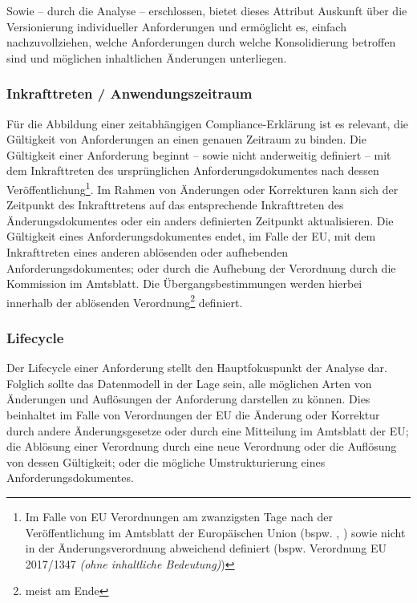 Sowie -- durch die Analyse -- erschlossen, bietet dieses Attribut Auskunft über die Versionierung individueller Anforderungen und ermöglicht es, einfach nachzuvollziehen, welche Anforderungen durch welche Konsolidierung betroffen sind und möglichen inhaltlichen Änderungen unterliegen.


\subsubsection{Inkrafttreten / Anwendungszeitraum}

Für die Abbildung einer zeitabhängigen Compliance-Erklärung ist es relevant, die Gültigkeit von Anforderungen an einen genauen Zeitraum zu binden.
Die Gültigkeit einer Anforderung beginnt -- sowie nicht anderweitig definiert -- mit dem Inkrafttreten des ursprünglichen Anforderungsdokumentes nach dessen Veröffentlichung\footnote{Im Falle von EU Verordnungen am zwanzigsten Tage nach der Veröffentlichung im Amtsblatt der Europäischen Union (bspw. \cite[Art. 141]{2018R1139}, \cite[Art. 14]{2004R0549}) sowie nicht in der Änderungsverordnung abweichend definiert (bspw. Verordnung EU 2017/1347 \textit{(ohne inhaltliche Bedeutung)})}.
Im Rahmen von Änderungen oder Korrekturen kann sich der Zeitpunkt des Inkrafttretens auf das entsprechende Inkrafttreten des Änderungsdokumentes oder ein anders definierten Zeitpunkt  aktualisieren.\cite{eu_consolidation}
Die Gültigkeit eines Anforderungsdokumentes endet, im Falle der EU, mit dem Inkrafttreten eines anderen ablösenden oder aufhebenden Anforderungsdokumentes; oder durch die Aufhebung der Verordnung durch die Kommission im Amtsblatt. 
Die Übergangsbestimmungen werden hierbei innerhalb der ablösenden Verordnung\footnote{meist am Ende} definiert.

\pagebreak

\subsubsection{Lifecycle}

Der Lifecycle einer Anforderung stellt den Hauptfokuspunkt der Analyse dar. 
Folglich sollte das Datenmodell in der Lage sein, alle möglichen Arten von Änderungen und Auflösungen der Anforderung darstellen zu können.
Dies beinhaltet im Falle von Verordnungen der EU die Änderung oder Korrektur durch andere Änderungsgesetze oder durch eine Mitteilung im Amtsblatt der EU; die Ablösung einer Verordnung durch eine neue Verordnung oder die Auflösung von dessen Gültigkeit; oder die mögliche Umstrukturierung eines Anforderungsdokumentes.


